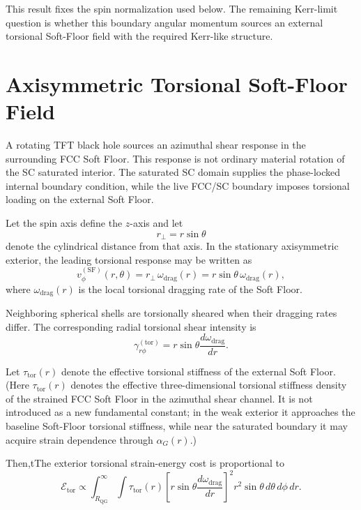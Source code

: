 This result fixes the spin normalization used below. The remaining Kerr-limit question is whether this boundary angular momentum sources an external torsional Soft-Floor field with the required Kerr-like structure.

\section{Axisymmetric Torsional Soft-Floor Field}

A rotating TFT black hole sources an azimuthal shear response in the surrounding FCC Soft Floor. This response is not ordinary material rotation of the SC saturated interior. The saturated SC domain supplies the phase-locked internal boundary condition, while the live FCC/SC boundary imposes torsional loading on the external Soft Floor.

Let the spin axis define the \(z\)-axis and let
\begin{equation}
    r_\perp = r\sin\theta
\end{equation}
denote the cylindrical distance from that axis. In the stationary axisymmetric exterior, the leading torsional response may be written as
\begin{equation}
    v_{\phi}^{(\mathrm{SF})}(r,\theta)
    =
    r_\perp\,\omega_{\mathrm{drag}}(r)
    =
    r\sin\theta\,\omega_{\mathrm{drag}}(r),
\end{equation}
where \(\omega_{\mathrm{drag}}(r)\) is the local torsional dragging rate of the Soft Floor.

Neighboring spherical shells are torsionally sheared when their dragging rates differ. The corresponding radial torsional shear intensity is
\begin{equation}
    \gamma_{r\phi}^{(\mathrm{tor})}
    =
    r\sin\theta
    \frac{d\omega_{\mathrm{drag}}}{dr}.
\end{equation}

Let \(\tau_{\mathrm{tor}}(r)\) denote the effective torsional stiffness of the external Soft Floor. (Here \(\tau_{\mathrm{tor}}(r)\) denotes the effective three-dimensional torsional stiffness density of the strained FCC Soft Floor in the azimuthal shear channel. It is not introduced as a new fundamental constant; in the weak exterior it approaches the baseline Soft-Floor torsional stiffness, while near the saturated boundary it may acquire strain dependence through \(\alpha_G(r)\).)

Then,tThe exterior torsional strain-energy cost is proportional to
\begin{equation}
    \mathcal{E}_{\mathrm{tor}}
    \propto
    \int_{R_{\mathrm{QG}}}^{\infty}
    \int
    \tau_{\mathrm{tor}}(r)
    \left[
    r\sin\theta
    \frac{d\omega_{\mathrm{drag}}}{dr}
    \right]^2
    r^2\sin\theta
    \,d\theta\,d\phi\,dr .
\end{equation}

